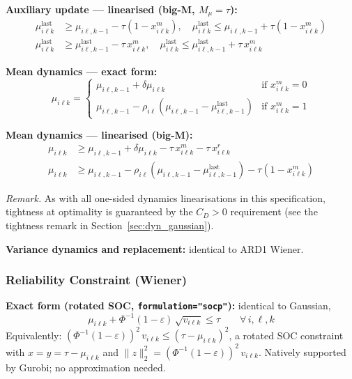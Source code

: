 \documentclass[11pt,a4paper]{article}
\begin{document}
\textbf{Auxiliary update --- linearised (big-M, $M_\mu = \tau$):}
\begin{align}
  \mu^{\mathrm{last}}_{i\ell k} &\geq \mu_{i\ell,k-1} - \tau(1-x^m_{i\ell k}), \quad
  \mu^{\mathrm{last}}_{i\ell k} \leq \mu_{i\ell,k-1} + \tau(1-x^m_{i\ell k}) \\
  \mu^{\mathrm{last}}_{i\ell k} &\geq \mu^{\mathrm{last}}_{i\ell,k-1} - \tau\,x^m_{i\ell k}, \quad
  \mu^{\mathrm{last}}_{i\ell k} \leq \mu^{\mathrm{last}}_{i\ell,k-1} + \tau\,x^m_{i\ell k}
\end{align}

\textbf{Mean dynamics --- exact form:}
\begin{equation}
  \mu_{i\ell k} = \begin{cases}
    \mu_{i\ell,k-1} + \delta\mu_{i\ell k} & \text{if } x^m_{i\ell k} = 0 \\
    \mu_{i\ell,k-1} - \rho_{i\ell}(\mu_{i\ell,k-1} - \mu^{\mathrm{last}}_{i\ell,k-1})
      & \text{if } x^m_{i\ell k} = 1
  \end{cases}
\end{equation}

\textbf{Mean dynamics --- linearised (big-M):}
\begin{align}
  \mu_{i\ell k} &\geq \mu_{i\ell,k-1} + \delta\mu_{i\ell k} - \tau\,x^m_{i\ell k}
    - \tau\,x^r_{i\ell k} \\
  \mu_{i\ell k} &\geq \mu_{i\ell,k-1}
    - \rho_{i\ell}(\mu_{i\ell,k-1} - \mu^{\mathrm{last}}_{i\ell,k-1})
    - \tau(1-x^m_{i\ell k})
\end{align}

\emph{Remark.} As with all one-sided dynamics linearisations in this specification,
tightness at optimality is guaranteed by the $C_D > 0$ requirement
(see the tightness remark in Section~\ref{sec:dyn_gaussian}).

\textbf{Variance dynamics and replacement:} identical to ARD1 Wiener.

\subsubsection{Reliability Constraint (Wiener)}

\textbf{Exact form (rotated SOC, \texttt{formulation="socp"}):} identical to Gaussian,
\begin{equation}
  \mu_{i\ell k} + \Phi^{-1}(1-\varepsilon)\,\sqrt{v_{i\ell k}} \leq \tau
  \qquad \forall\, i,\ell,k
\end{equation}
Equivalently: $(\Phi^{-1}(1-\varepsilon))^2\,v_{i\ell k} \leq (\tau - \mu_{i\ell k})^2$,
a rotated SOC constraint with $x = y = \tau - \mu_{i\ell k}$ and
$\|z\|_2^2 = (\Phi^{-1}(1-\varepsilon))^2\,v_{i\ell k}$.
Natively supported by Gurobi; no approximation needed.
\end{document}
